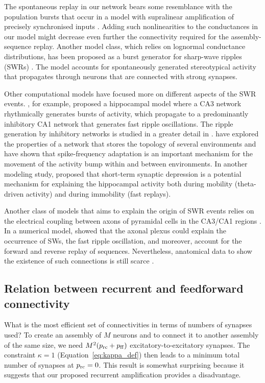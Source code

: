     The spontaneous replay in our network bears some resemblance with the
    population bursts that occur in a model with supralinear amplification of
    precisely synchronised inputs \citep{Memmesheimer2010, Jahnke2015}. Adding
    such nonlinearities to the conductances in our model might decrease even
    further the connectivity required for the assembly-sequence replay. Another
    model class, which relies on lognormal conductance distributions, has been
    proposed as a burst generator for sharp-wave ripples (SWRs)
    \citep{Omura2015}. The model accounts for spontaneously generated
    stereotypical activity that propagates through neurons that are connected
    with strong synapses.

    Other computational models have focused more on different aspects of the
    SWR events. \cite{Taxidis2012}, for example, proposed a
    hippocampal model where a CA3 network rhythmically generates bursts of
    activity, which propagate to a predominantly inhibitory CA1 network that
    generates fast ripple oscillations. The ripple generation by inhibitory
    networks is studied in a greater detail in
    \cite{Malerba2016}. \cite{Azizi2013} have explored the
    properties of a network that stores the topology of several environments
    and have shown that spike-frequency adaptation is an important mechanism
    for the movement of the activity bump within and between environments. In
    another modeling study, \cite{Romani2015} proposed that
    short-term synaptic depression is a potential mechanism for explaining the
    hippocampal activity both during mobility (theta-driven activity) and
    during immobility (fast replays).

    Another class of models that aims to explain the origin of SWR events
    relies on the electrical coupling between axons of pyramidal cells in the
    CA3/CA1 regions \citep{Draguhn1998, Schmitz2001, Traub2012}. In a numerical
    model, \cite{Vladimirov2013} showed that the axonal plexus could
    explain the occurrence of SWs, the fast ripple oscillation, and moreover,
    account for the forward and reverse replay of sequences. Nevertheless,
    anatomical data to show the existence of such connections is still scarce
    \citep{Hamzei2007}.

  \subsection{Relation between recurrent and feedforward connectivity} What is
    the most efficient set of connectivities in terms of numbers of synapses
    used? To create an assembly of $M$ neurons and to connect it to another
    assembly of the same size, we need $M^2 (p_{\rm rc} + p_{\rm ff})$
    excitatory-to-excitatory synapses. The constraint $\kappa =1$
    (Equation~\ref{eq:kappa_def}) then leads to a minimum total number of synapses at
    $p_{\rm rc} = 0$. This result is somewhat surprising because it suggests
    that our proposed recurrent amplification provides a disadvantage.

